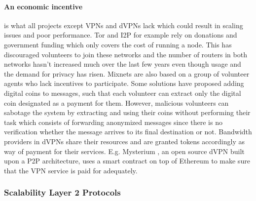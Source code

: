 \paragraph{An economic incentive} is what all projects except VPNs and dVPNs
lack which could result in scaling issues and poor performance. Tor and I2P
for example rely on donations and government funding which only covers the cost
of running a node. This has discouraged volunteers to join these networks and the
number of routers in both networks hasn't increased much over the last few years
even though usage and the demand for privacy has risen.
Mixnets are also based on a group of volunteer agents who lack incentives to
participate. Some solutions have proposed adding digital coins to messages, such
that each volunteer can extract only the digital coin designated as a payment
for them. However, malicious volunteers can sabotage the system by extracting
and using their coins without performing their task which consists of forwarding
anonymized messages since there is no verification whether the message arrives
to its final destination or not. Bandwidth providers in dVPNs share their
resources and are granted tokens accordingly as way of payment for their
services. E.g. Mysterium \cite{mysterium}, an open source dVPN built upon a P2P
architecture, uses a smart contract on top of Ethereum to make sure
that the VPN service is paid for adequately.

\subsubsection{Scalability Layer 2 Protocols}
\label{sec:l2protocols}

